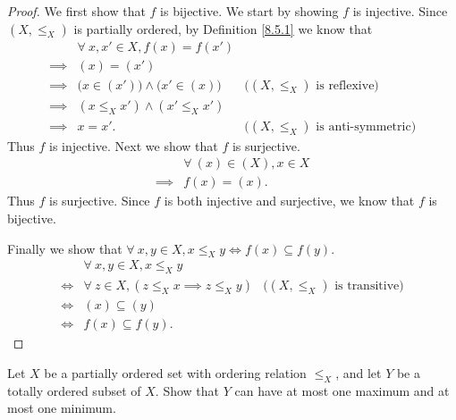 \begin{proof}
    We first show that \(f\) is bijective.
    We start by showing \(f\) is injective.
    Since \((X, \leq_X)\) is partially ordered, by Definition \ref{8.5.1} we know that
    \begin{align*}
                 & \forall\ x, x' \in X, f(x) = f(x')                                                           \\
        \implies & (x) = (x')                                                                                   \\
        \implies & \big(x \in (x')\big) \land \big(x' \in (x)\big) & \text{(\((X, \leq_X)\) is reflexive)}      \\
        \implies & (x \leq_X x') \land (x' \leq_X x')                                                           \\
        \implies & x = x'.                                         & \text{(\((X, \leq_X)\) is anti-symmetric)}
    \end{align*}
    Thus \(f\) is injective.
    Next we show that \(f\) is surjective.
    \begin{align*}
                 & \forall\ (x) \in (X), x \in X \\
        \implies & f(x) = (x).
    \end{align*}
    Thus \(f\) is surjective.
    Since \(f\) is both injective and surjective, we know that \(f\) is bijective.

    Finally we show that \(\forall\ x, y \in X, x \leq_X y \iff f(x) \subseteq f(y)\).
    \begin{align*}
             & \forall\ x, y \in X, x \leq_X y                                                             \\
        \iff & \forall\ z \in X, (z \leq_X x \implies z \leq_X y) & \text{(\((X, \leq_X)\) is transitive)} \\
        \iff & (x) \subseteq (y)                                                                           \\
        \iff & f(x) \subseteq f(y).
    \end{align*}
\end{proof}

\begin{exercise}\label{ex 8.5.7}
    Let \(X\) be a partially ordered set with ordering relation \(\leq_X\), and let \(Y\) be a totally ordered subset of \(X\).
    Show that \(Y\) can have at most one maximum and at most one minimum.
\end{exercise}

